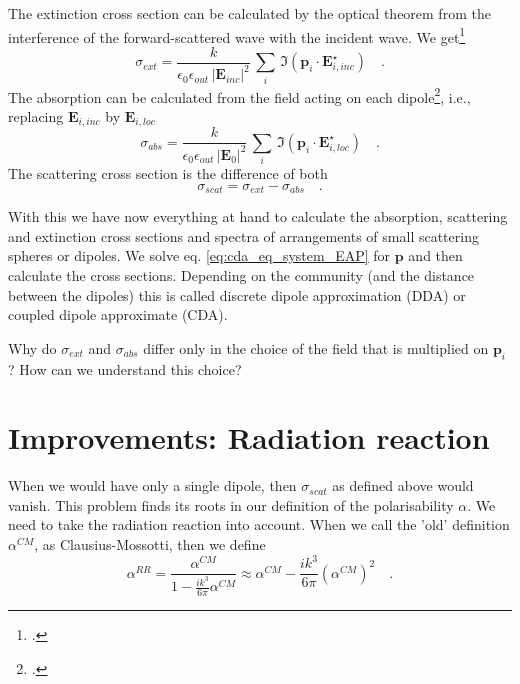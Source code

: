 The extinction cross section can be calculated by the optical theorem from the interference of the forward-scattered wave with the incident wave. We get\footcite{Draine88,Yurkin07}
\begin{equation}
\sigma_{ext} = \frac{k}{\epsilon_0 \epsilon_{out}  \, |\mathbf{E}_{inc}|^2} \, \sum_i \, \Im ( \mathbf{p}_i \cdot \mathbf{E}_{i, inc}^\star ) \quad .
\end{equation}
 The absorption can be calculated from the field acting on each dipole\footcite{Yurkin07}, i.e., replacing $\mathbf{E}_{i, inc} $ by $\mathbf{E}_{i, loc} $ 
 \begin{equation}
\sigma_{abs} = \frac{k}{\epsilon_0 \epsilon_{out}  \, |\mathbf{E}_{0}|^2} \, \sum_i \, \Im ( \mathbf{p}_i \cdot \mathbf{E}_{i, loc}^\star ) \quad .
\end{equation}
The scattering cross section is the difference of both
\begin{equation}
\sigma_{scat} = \sigma_{ext}  - \sigma_{abs} \quad .
\end{equation}
 
With this we have now everything at hand to calculate the absorption, scattering and extinction cross sections and spectra of arrangements  of small scattering spheres or dipoles. We solve eq. \ref{eq:cda_eq_system_EAP} for $\mathbf{p}$ and then calculate the cross sections. Depending on the community (and the distance between the dipoles) this is called discrete dipole approximation (DDA) or coupled dipole approximate (CDA).
 
 
\begin{questions}
\item Why do $\sigma_{ext}$ and $\sigma_{abs}$ differ only in  the choice of the field that is multiplied on $\mathbf{p}_i$? How can we understand this choice?
\end{questions}

 
\section{Improvements: Radiation reaction} 

When we would have only a single dipole, then $\sigma_{scat}$ as defined above would vanish. This problem finds its roots in our definition of the polarisability $\alpha$. We need to take the radiation reaction into account. When we call the 'old' definition $\alpha^{CM}$, as Clausius-Mossotti, then we define 
\begin{equation}
\alpha^{RR} = \frac{\alpha^{CM}}{1 - \frac{i k^3}{6 \pi} \alpha^{CM}}
\approx
\alpha^{CM} -  \frac{i k^3}{6 \pi} \left(\alpha^{CM}\right)^2 \quad .
\end{equation}

